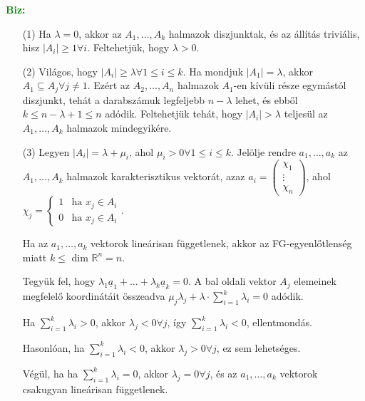 \documentclass[../szamtud.tex]{subfiles}
\begin{document}
        \textcolor{green}{\textbf{Biz:}} \begin{itemize}
            \item[(1)] Ha $\lambda = 0$, akkor az $A_1, \dots, A_k$ halmazok diszjunktak, és az állítás triviális, hisz $|A_i| \geq 1 \forall i$. Feltehetjük, hogy $\lambda > 0$.
            \item[(2)] Világos, hogy $|A_i| \geq \lambda \forall 1 \leq i \leq k$. Ha mondjuk $|A_1| = \lambda$, akkor $A_1 \subseteq A_j \forall j \neq 1$. Ezért az $A_2, \dots, A_n$ halmazok $A_1$-en kívüli része egymástól diszjunkt, tehát a darabszámuk legfeljebb $n-\lambda$ lehet, és ebből $k \leq n - \lambda + 1 \leq n$ adódik. Feltehetjük tehát, hogy $|A_i| > \lambda$ teljesül az $A_1, \dots, A_k$ halmazok mindegyikére.
            \item[(3)] Legyen $|A_i| = \lambda + \mu_i$, ahol $\mu_i > 0 \forall 1 \leq i \leq k$. 
            Jelölje rendre $a_1, \dots, a_k$ az $A_1, \dots, A_k$ halmazok karakterisztikus vektorát, azaz $a_i = \begin{pmatrix} \chi_1 \\ \vdots \\ \chi_n \end{pmatrix}$, ahol $\chi_j = \begin{cases} 1 &\text{ha } x_j \in A_i \\ 0 &\text{ha } x_j \in A_i \end{cases}$.
    
            Ha az $a_1, \dots, a_k$ vektorok lineárisan függetlenek, akkor az FG-egyenlőtlenség miatt $k \leq$ dim $\mathbb{R}^n = n$.
    
            Tegyük fel, hogy $\lambda_1 \underline{a}_1 + \dots + \lambda_k \underline{a}_k = 0$. A bal oldali vektor $A_j$ elemeinek megfelelő koordinátáit összeadva $\mu_j \lambda_j + \lambda \cdot \sum_{i=1}^{k}\lambda_i = 0$ adódik. 
    
            Ha $\sum_{i=1}^{k}\lambda_i > 0$, akkor $\lambda_j < 0 \forall j$, így $\sum_{i=1}^{k}\lambda_i < 0$, ellentmondás.
    
            Hasonlóan, ha $\sum_{i=1}^{k}\lambda_i < 0$, akkor $\lambda_j > 0 \forall j$, ez sem lehetséges. 
    
            Végül, ha ha $\sum_{i=1}^{k}\lambda_i = 0$, akkor $\lambda_j = 0 \forall j$, és az $a_1, \dots, a_k$ vektorok csakugyan lineárisan függetlenek. 
        \end{itemize}
        
\end{document}
